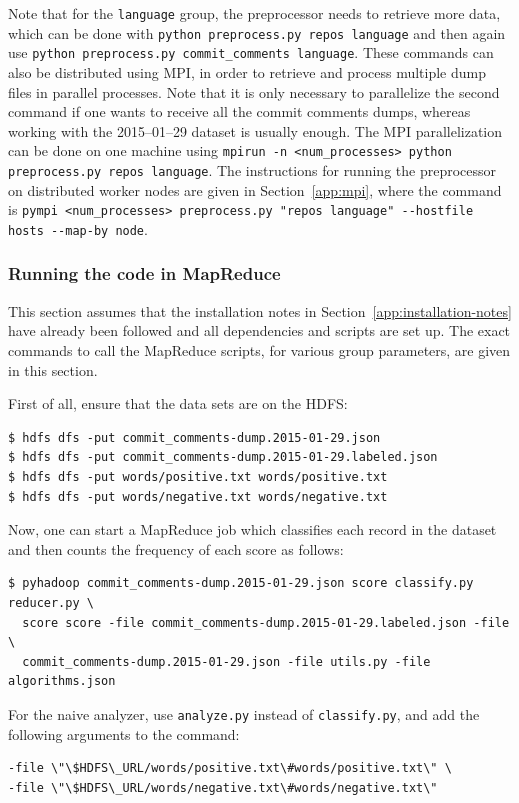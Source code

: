 \documentclass{article}
\begin{document}
Note that for the \texttt{language} group, the preprocessor needs to retrieve 
more data, which can be done with \texttt{python preprocess.py repos language} 
and then again use \texttt{python preprocess.py commit\_comments language}. 
These commands can also be distributed using MPI, in order to retrieve and 
process multiple dump files in parallel processes. Note that it is only 
necessary to parallelize the second command if one wants to receive all the 
commit comments dumps, whereas working with the 2015--01--29 dataset is 
usually enough. The MPI parallelization can be done on one machine using 
\texttt{mpirun -n <num\_processes> python preprocess.py 
repos language}. The instructions for running the preprocessor on distributed 
worker nodes are given in Section~\ref{app:mpi}, where the command is 
\texttt{pympi <num\_processes> preprocess.py "repos 
language" -{}-hostfile hosts -{}-map-by node}.

\subsubsection{Running the code in MapReduce}\label{app:mapreduce}
This section assumes that the installation notes in 
Section~\ref{app:installation-notes} have already been followed and all 
dependencies and scripts are set up. The exact commands to call the MapReduce 
scripts, for various group parameters, are given in this section.

First of all, ensure that the data sets are on the HDFS:

\begin{verbatim}
$ hdfs dfs -put commit_comments-dump.2015-01-29.json
$ hdfs dfs -put commit_comments-dump.2015-01-29.labeled.json
$ hdfs dfs -put words/positive.txt words/positive.txt
$ hdfs dfs -put words/negative.txt words/negative.txt
\end{verbatim}

Now, one can start a MapReduce job which classifies each record in the dataset 
and then counts the frequency of each score as follows:

\begin{verbatim}
$ pyhadoop commit_comments-dump.2015-01-29.json score classify.py reducer.py \
  score score -file commit_comments-dump.2015-01-29.labeled.json -file \
  commit_comments-dump.2015-01-29.json -file utils.py -file algorithms.json
\end{verbatim}

For the naive analyzer, use \texttt{analyze.py} instead of 
\texttt{classify.py}, and add the following arguments to the 
command:
\begin{verbatim}
-file \"\$HDFS\_URL/words/positive.txt\#words/positive.txt\" \
-file \"\$HDFS\_URL/words/negative.txt\#words/negative.txt\"
\end{verbatim}
\end{document}
